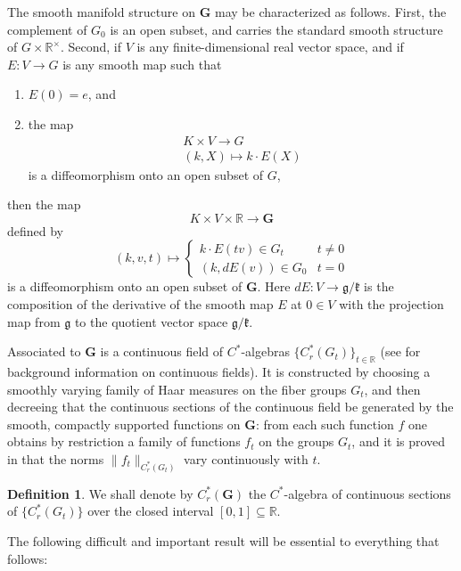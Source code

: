 \documentclass[leqno,11pt]{amsart}
\numberwithin{equation}{subsection}
\theoremstyle{plain}
\theoremstyle{definition}
\newtheorem{definition}[equation]{Definition}
\theoremstyle{remark}
\newcommand{\R}{\mathbb{R}}
\newcommand{\GG}{\pmb{G}}
\begin{document}
The smooth manifold structure on $\GG$ may be characterized as follows. First, the complement of $G_0$ is an open subset, and carries the standard smooth structure of $G\times \R^{\times}$.  Second, if $V$ is any finite-dimensional real vector space, and if $E\colon V \to G$ is any smooth map  such that 
\begin{enumerate}[\rm (i)]

\item $E(0) = e$, and 

\item the map 
\[
\begin{gathered}
K\times V \longrightarrow G
\\
(k,X) \longmapsto k \cdot E(X)
\end{gathered}
\]
is a diffeomorphism onto an open subset of $G$, 
\end{enumerate}
then the map  
\[
K \times V  \times \R \longrightarrow \pmb{G}
\]
defined by 
\[
(k,v,t) \longmapsto \begin{cases} k \cdot E(tv) \in G_t & t \ne 0 \\
(k,dE(v))\in G_0 & t=0
\end{cases}
\]
is a diffeomorphism onto an open subset of $\pmb{G}$.  Here $dE \colon V \to \mathfrak{g} / \mathfrak{k}$ is the composition of the derivative of the smooth map $E$ at $0\in V$ with the projection map from $\mathfrak{g} $ to the quotient vector space $\mathfrak{g}/\mathfrak{k}$.


Associated to $\GG $ is a continuous field of $C^*$-algebras $\{ C^*_r (G_t)\} _{t\in \R}$ (see \cite[Ch.\,10]{Dixmier1977} for background information on continuous fields).  It is constructed by choosing a smoothly varying family of Haar measures on the fiber groups $G_t$, and then decreeing that the continuous sections of the continuous field  be generated by the smooth, compactly supported functions on $\GG $: from each such function $f$ one obtains by restriction a family of functions $f_t$ on the  groups $G_t$, and it is proved in \cite[Lemma\,6.13]{Higson08} that the norms $\| f_t\|_{C^*_r (G_t)}$ vary continuously with $t$.


 \begin{definition} 
 We shall denote by $C^*_r (\GG )$ the $C^*$-algebra of continuous sections of $\{ C^*_r (G_t)\} $ over the closed interval $[0,1] \subseteq \R$.
 \end{definition} 
 
 
The following difficult and important result will be essential to everything that follows: 
\end{document}
